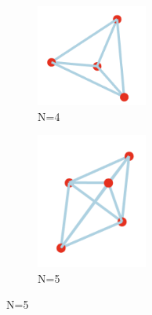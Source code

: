 \documentclass[11pt,onecolumn]{article}
\begin{document}
\newpage
\begin{figure}[h]
  \centering
  \begin{subfigure}[b]{0.4\textwidth}
    \centering
    \includegraphics[width=0.4\textwidth]{N4.png}
    \caption{N=4}
    \label{fig:sub1}
  \end{subfigure}
  \hfill
  \begin{subfigure}[b]{0.4\textwidth}
    \centering
    \includegraphics[width=0.4\textwidth]{N5.png}
    \caption{N=5}
    \label{fig:sub2}
  \end{subfigure}

  \vspace{0.5em}


\end{figure}
\end{document}
